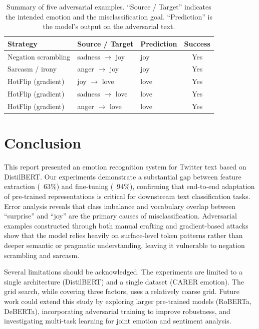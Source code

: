 \documentclass{article}
\begin{document}
\begin{table}[tbp]
  \centering
  \caption{Summary of five adversarial examples.  ``Source / Target''
           indicates the intended emotion and the misclassification
           goal.  ``Prediction'' is the model's output on the
           adversarial text.}
  \label{tab:adversarial-summary}
  \begin{tabular}{lllc}
    \toprule
    Strategy & Source / Target & Prediction & Success \\
    \midrule
    Negation scrambling & sadness $\rightarrow$ joy & joy & Yes \\
    Sarcasm / irony      & anger  $\rightarrow$ joy & joy & Yes \\
    HotFlip (gradient)   & joy $\rightarrow$ love  & love & Yes \\
    HotFlip (gradient)   & sadness $\rightarrow$ love & love & Yes \\
    HotFlip (gradient)   & anger $\rightarrow$ love & love & Yes  \\
    \bottomrule
  \end{tabular}
\end{table}


\section{Conclusion}\label{sec:conclusion}

This report presented an emotion recognition system for Twitter text
based on DistilBERT.  Our experiments demonstrate a substantial gap
between feature extraction (~63\%) and fine-tuning (~94\%), confirming
that end-to-end adaptation of pre-trained representations is critical
for downstream text classification tasks.  Error analysis reveals that
class imbalance and vocabulary overlap between ``surprise'' and ``joy''
are the primary causes of misclassification.  Adversarial examples
constructed through both manual crafting and gradient-based attacks
show that the model relies heavily on surface-level token patterns
rather than deeper semantic or pragmatic understanding, leaving it
vulnerable to negation scrambling and sarcasm.

Several limitations should be acknowledged.  The experiments are
limited to a single architecture (DistilBERT) and a single dataset
(CARER emotion).  The grid search, while covering three factors, uses
a relatively coarse grid.  Future work could extend this study by
exploring larger pre-trained models (RoBERTa, DeBERTa), incorporating
adversarial training to improve robustness, and investigating
multi-task learning for joint emotion and sentiment analysis.


\end{document}
